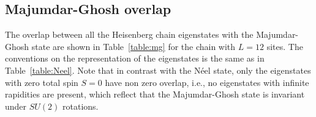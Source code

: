 \documentclass[11pt]{iopart}
\begin{document}
\subsection{Majumdar-Ghosh overlap}
\label{app-mg}

The overlap between all the Heisenberg chain eigenstates with the Majumdar-Ghosh state are shown in 
Table~\ref{table:mg} for the chain with $L=12$ sites. The conventions on the representation of 
the eigenstates is the same as in Table~\ref{table:Neel}. Note that in contrast with the N\'eel 
state, only the eigenstates with zero total spin $S=0$ have non zero overlap, i.e., no eigenstates 
with infinite rapidities are present, which reflect that the Majumdar-Ghosh state is invariant 
under $SU(2)$ rotations. 


\end{document}
